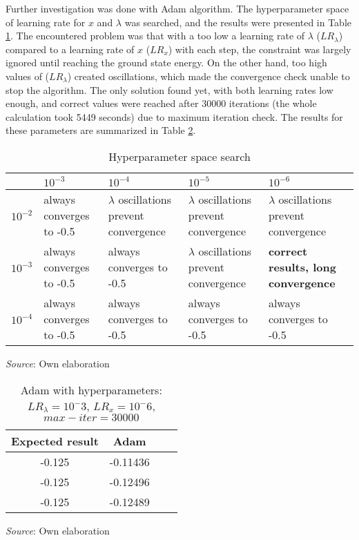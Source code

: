 Further investigation was done with Adam algorithm. The hyperparameter space of learning rate for $x$ and $\lambda$ was searched, and the results were presented in Table \ref{tab:hyperparameter-search}. The encountered problem was that with a too low a learning rate of $\lambda$ ($LR_\lambda$) compared to a learning rate of $x$ ($LR_x$) with each step, the constraint was largely ignored until reaching the ground state energy. On the other hand, too high values of ($LR_\lambda$) created oscillations, which made the convergence check unable to stop the algorithm. The only solution found yet, with both learning rates low enough, and correct values were reached after 30000 iterations (the whole calculation took 5449 seconds) due to maximum iteration check. The results for these parameters are summarized in Table \ref{tab:adam-optimized}.

\renewcommand{\arraystretch}{1.5}
\begin{table}[h]
	\centering
	\caption{Hyperparameter space search}
	\label{tab:hyperparameter-search}
	\small
	\begin{tabular}{|c|>{\centering\arraybackslash}p{3cm}|>{\centering\arraybackslash}p{3cm}|>{\centering\arraybackslash}p{3cm}|>{\centering\arraybackslash}p{3cm}|}
		
		\hline
		\diagbox[dir=SE]{$LR_\lambda$}{$LR_x$} & $10^{-3}$ & $10^{-4}$ & $10^{-5}$  & $10^{-6}$\\ 
		\hline
		$10^{-2}$ & always converges to -0.5 & $\lambda$ oscillations prevent convergence  & $\lambda$ oscillations prevent convergence & $\lambda$ oscillations prevent convergence  \\ 
		\hline
		$10^{-3}$ & always converges to -0.5 & always converges to -0.5 & $\lambda$ oscillations prevent convergence & \textbf{correct results, long convergence}  \\ 
		\hline
		$10^{-4}$ & always converges to -0.5 & always converges to -0.5 & always converges to -0.5 & always converges to -0.5  \\ 
		\hline
	\end{tabular}
	\smallskip
	
	\small \textit{Source}: Own elaboration
\end{table}


\begin{table}[!ht]
	\centering
	\caption{Adam with hyperparameters: $LR_\lambda=10^-3$, $LR_x = 10^-6$, $max-iter = 30000$}
	\label{tab:adam-optimized}
	\small %
	\begin{tabular}{|c|c|c|c|}
		\hline
		\textbf{Expected result} & \textbf{Adam}  \\ \hline
		-0.125    & -0.11436 \\ \hline
		-0.125      & -0.12496 \\ \hline
		-0.125     & -0.12489 \\ \hline
	\end{tabular}
	\smallskip
	
	\small \textit{Source}: Own elaboration
\end{table}

